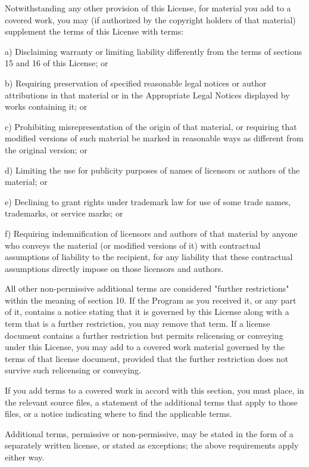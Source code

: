 \documentclass[parskip=half]{scrartcl}
\begin{document}
  Notwithstanding any other provision of this License, for material you
add to a covered work, you may (if authorized by the copyright holders of
that material) supplement the terms of this License with terms:

    a) Disclaiming warranty or limiting liability differently from the
    terms of sections 15 and 16 of this License; or

    b) Requiring preservation of specified reasonable legal notices or
    author attributions in that material or in the Appropriate Legal
    Notices displayed by works containing it; or

    c) Prohibiting misrepresentation of the origin of that material, or
    requiring that modified versions of such material be marked in
    reasonable ways as different from the original version; or

    d) Limiting the use for publicity purposes of names of licensors or
    authors of the material; or

    e) Declining to grant rights under trademark law for use of some
    trade names, trademarks, or service marks; or

    f) Requiring indemnification of licensors and authors of that
    material by anyone who conveys the material (or modified versions of
    it) with contractual assumptions of liability to the recipient, for
    any liability that these contractual assumptions directly impose on
    those licensors and authors.

  All other non-permissive additional terms are considered "further
restrictions" within the meaning of section 10.  If the Program as you
received it, or any part of it, contains a notice stating that it is
governed by this License along with a term that is a further
restriction, you may remove that term.  If a license document contains
a further restriction but permits relicensing or conveying under this
License, you may add to a covered work material governed by the terms
of that license document, provided that the further restriction does
not survive such relicensing or conveying.

  If you add terms to a covered work in accord with this section, you
must place, in the relevant source files, a statement of the
additional terms that apply to those files, or a notice indicating
where to find the applicable terms.

  Additional terms, permissive or non-permissive, may be stated in the
form of a separately written license, or stated as exceptions;
the above requirements apply either way.
\end{document}
